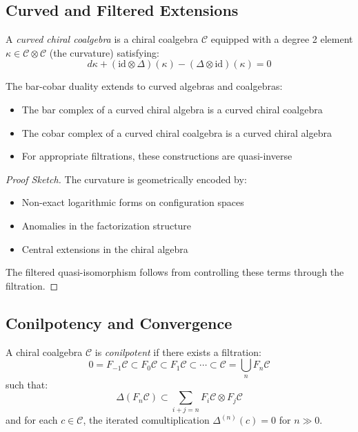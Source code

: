 \subsection{Curved and Filtered Extensions}

\begin{definition}\label{def:curved-chiral}
A \emph{curved chiral coalgebra} is a chiral coalgebra $\mathcal{C}$ equipped with a degree 2 element $\kappa \in \mathcal{C} \otimes \mathcal{C}$ (the curvature) satisfying:
\[
d\kappa + (\text{id} \otimes \Delta)(\kappa) - (\Delta \otimes \text{id})(\kappa) = 0
\]
\end{definition}

\begin{theorem}\label{thm:curved-duality}
The bar-cobar duality extends to curved algebras and coalgebras:
\begin{itemize}
\item The bar complex of a curved chiral algebra is a curved chiral coalgebra
\item The cobar complex of a curved chiral coalgebra is a curved chiral algebra
\item For appropriate filtrations, these constructions are quasi-inverse
\end{itemize}
\end{theorem}

\begin{proof}[Proof Sketch]
The curvature is geometrically encoded by:
\begin{itemize}
\item Non-exact logarithmic forms on configuration spaces
\item Anomalies in the factorization structure
\item Central extensions in the chiral algebra
\end{itemize}
The filtered quasi-isomorphism follows from controlling these terms through the filtration.
\end{proof}

\subsection{Conilpotency and Convergence}

\begin{definition}\label{def:conilpotent}
A chiral coalgebra $\mathcal{C}$ is \emph{conilpotent} if there exists a filtration:
\[
0 = F_{-1}\mathcal{C} \subset F_0\mathcal{C} \subset F_1\mathcal{C} \subset \cdots \subset \mathcal{C} = \bigcup_n F_n\mathcal{C}
\]
such that:
\[
\Delta(F_n\mathcal{C}) \subset \sum_{i+j=n} F_i\mathcal{C} \otimes F_j\mathcal{C}
\]
and for each $c \in \mathcal{C}$, the iterated comultiplication $\Delta^{(n)}(c) = 0$ for $n \gg 0$.
\end{definition}


